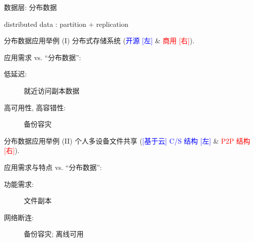 \begin{frame}{数据层: 分布数据}

  \begin{center}
    {\LARGE distributed data : partition + replication}
  \end{center}

\end{frame}
\begin{frame}{分布数据应用举例 (I)}
  {分布式存储系统 (\textcolor{blue}{\scriptsize 开源 [左]} \& \textcolor{red}{\scriptsize 商用 [右]}).}

  应用需求  vs. ``分布数据'':
  \begin{description}
    \item[低延迟:] 就近访问副本数据
    \item[高可用性, 高容错性:] 备份容灾 
  \end{description}
\end{frame}
\begin{frame}{分布数据应用举例 (II)}
  {个人多设备文件共享 {(\textcolor{blue}{\scriptsize [基于云] C/S 结构 [左]} \& 
  \textcolor{red}{\scriptsize P2P 结构 [右]}).}}

  应用需求与特点  vs. ``分布数据'':
  \begin{description}
    \item[功能需求:] 文件副本
    \item[网络断连:] 备份容灾; 离线可用
  \end{description}
\end{frame}
% 
